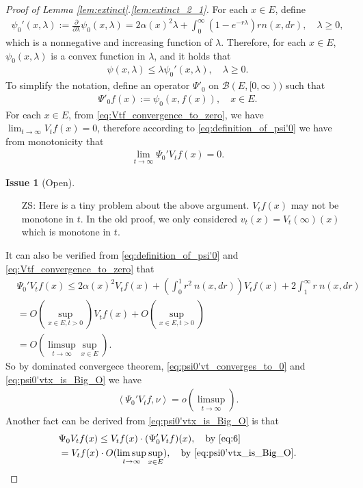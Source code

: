 \documentclass[12pt,a4paper]{amsart}
\numberwithin{equation}{section}
\theoremstyle{plain}
\theoremstyle{definition}
\newtheorem{iss}{Issue}
\begin{document}
\begin{proof}[Proof of Lemma \ref{lem:extinct}.\eqref{lem:extinct_2_1}]

For each $x\in E$, define 
\begin{align}
\label{eq:definition_of_psi'0}
 \psi_0'(x,\lambda):=\frac{\partial}{\partial \lambda}\psi_0(x,\lambda)
    =2\alpha(x)^2\lambda+\int_0^{\infty}\left(1-e^{-r\lambda}\right)rn(x,dr), 
    \quad \lambda \geq 0,
\end{align}
which is a nonnegative and increasing function of $\lambda$. 
Therefore, for each $x\in E$, $\psi_0(x,\lambda)$ is a convex function in $\lambda$, and it holds that
\begin{align}
\psi(x,\lambda) \leq \lambda \psi_0'(x,\lambda),
\quad \lambda \geq 0.
\label{eq:6}
\end{align}
To simplify the notation, define an operator $\Psi'_0$ on $\mathcal B(E,[0,\infty))$ such that
\begin{align}
\Psi'_0 f(x) := \psi_0(x,f(x)), \quad x\in E.
\end{align}
For each $x\in E$, from \eqref{eq:Vtf_convergence_to_zero}, we have $\lim_{t\to \infty} V_tf(x) = 0$, therefore according to \eqref{eq:definition_of_psi'0} we have from monotonicity that 
\begin{align}
\label{eq:psi0'vt_converges_to_0}
\lim_{t\to \infty}\Psi_0' V_tf(x) = 0.
\end{align}
\begin{iss}[Open]~
  \begin{itemize}
  \item[ZS:]
Here is a tiny problem about the above argument. $V_t f(x)$ may not be monotone in $t$. In the old proof, we only considered $v_t(x) = V_t(\infty)(x)$ which is monotone in $t$. 
  \end{itemize}
\end{iss}

It can also be verified from \eqref{eq:definition_of_psi'0} and \eqref{eq:Vtf_convergence_to_zero} that
\begin{align}
&\Psi_0'V_tf(x) \leq 2\alpha(x)^2 V_tf(x)+ \left(\int_0^1 r^2~n(x, dr)\right) V_tf(x) + 2 \int_1^\infty r~n(x,dr)
\\&= O(\sup_{x\in E,t>0})V_tf(x)+ O(\sup_{x\in E,t>0})
\\&=  O(\limsup_{t\to \infty} \sup_{x\in E}). \label{eq:psi0'vtx_is_Big_O}
\end{align}
So by dominated convergece theorem, \eqref{eq:psi0'vt_converges_to_0} and \eqref{eq:psi0'vtx_is_Big_O} we have
\begin{align}
\label{eq:Psi0'Vtfnu_is_smallo}
\left\langle \Psi_0' V_tf, \nu \right\rangle = o(\limsup_{t\to \infty}).
\end{align}
Another fact can be derived from \eqref{eq:psi0'vtx_is_Big_O} is that
\begin{align}
&\Psi_0 V_tf(x) 
\leq V_tf(x) \cdot (\Psi'_0 V_tf)(x) ,\quad\text{by~\eqref{eq:6}}
  \\&= V_tf(x)\cdot O(\limsup_{t\to \infty} \sup_{x\in E}),\quad\text{by~\eqref{eq:psi0'vtx_is_Big_O}}.\label{eq:Psi0_Vtf_leq_Vtf}
\end{align}


\end{proof}
\end{document}
